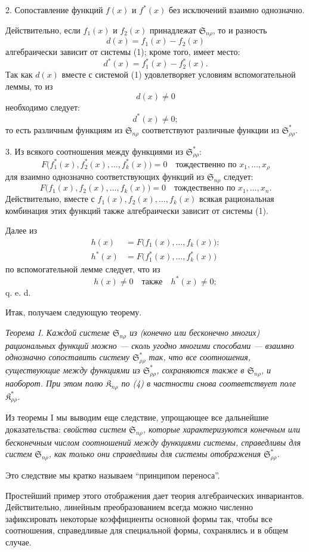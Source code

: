 \documentclass[11pt]{article}
\providecommand{\Kfield}{\mathfrak{K}}
\providecommand{\Ssys}{\mathfrak{S}}
\begin{document}
2. Сопоставление функций $f(x)$ и $f^*(x)$ без исключений взаимно однозначно.

Действительно, если $f_1(x)$ и $f_2(x)$ принадлежат $\Ssys_{n\rho}$, то и разность
\[
  d(x)=f_1(x)-f_2(x)
\]
алгебраически зависит от системы (1); кроме того, имеет место:
\[
  d^*(x)=f_1^*(x)-f_2^*(x).
\]
Так как $d(x)$ вместе с системой (1) удовлетворяет условиям вспомогательной леммы, то из
\[
  d(x)\ne0
\]
необходимо следует:
\[
  d^*(x)\ne0;
\]
то есть различным функциям из $\Ssys_{n\rho}$ соответствуют различные функции из $\Ssys^*_{\rho\rho}$.

3. Из всякого соотношения между функциями из $\Ssys^*_{\rho\rho}$:
\[
  F\bigl(f_1^*(x),f_2^*(x),\ldots,f_k^*(x)\bigr)=0
  \quad\text{тождественно по }x_1,\ldots,x_\rho
\]
для взаимно однозначно соответствующих функций из $\Ssys_{n\rho}$ следует:
\[
  F\bigl(f_1(x),f_2(x),\ldots,f_k(x)\bigr)=0
  \quad\text{тождественно по }x_1,
\ldots,x_n.
\]
Действительно, вместе с $f_1(x),f_2(x),\ldots,f_k(x)$ всякая рациональная комбинация этих функций также алгебраически зависит от системы (1).

Далее из
\begin{equation}
\begin{aligned}
 h(x)&=F\bigl(f_1(x),\ldots,f_k(x)\bigr):\\
 h^*(x)&=F\bigl(f_1^*(x),\ldots,f_k^*(x)\bigr)
\end{aligned}
\tag{4}
\end{equation}
по вспомогательной лемме следует, что из
\[
  h(x)\ne0\quad\text{также}\quad h^*(x)\ne0;
\]
q. e. d.

Итак, получаем следующую теорему.

{\itshape Теорема I. Каждой системе $\Ssys_{n\rho}$ из (конечно или бесконечно многих) рациональных функций можно --- сколь угодно многими способами --- взаимно однозначно сопоставить систему $\Ssys^*_{\rho\rho}$ так, что все соотношения, существующие между функциями из $\Ssys^*_{\rho\rho}$, сохраняются также в $\Ssys_{n\rho}$, и наоборот. При этом полю $\Kfield_{n\rho}$ по (4) в частности снова соответствует поле $\Kfield^*_{\rho\rho}$.}

Из теоремы I мы выводим еще следствие, упрощающее все дальнейшие доказательства: {\itshape свойства систем $\Ssys_{n\rho}$, которые характеризуются конечным или бесконечным числом соотношений между функциями системы, справедливы для систем $\Ssys_{n\rho}$, как только они справедливы для системы отображения $\Ssys^*_{\rho\rho}$.}

Это следствие мы кратко называем ``принципом переноса''.

\providecommand{\Lsys}{\mathfrak{L}}
\providecommand{\Jdom}{\mathfrak{J}}

\clearpage
Простейший пример этого отображения дает теория алгебраических инвариантов. Действительно, линейным преобразованием всегда можно численно зафиксировать некоторые коэффициенты основной формы так, чтобы все соотношения, справедливые для специальной формы, сохранялись и в общем случае.
\end{document}
